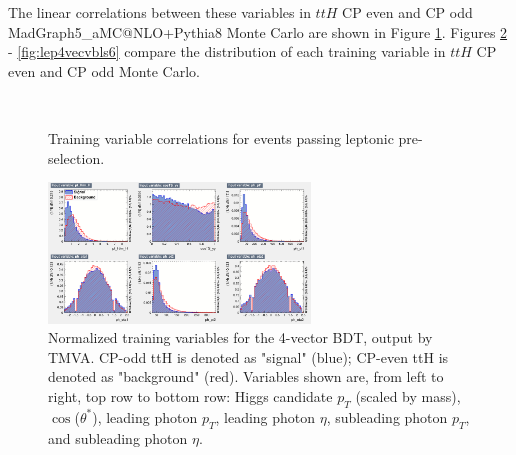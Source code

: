 The linear correlations between these variables in $ttH$ CP even and CP odd MadGraph5\_aMC@NLO+Pythia8 Monte Carlo are shown in Figure \ref{fig:lepcorr4vec}.  Figures \ref{fig:lep4vecvbls1} - \ref{fig:lep4vecvbls6} compare the distribution of each training variable in $ttH$ CP even and CP odd Monte Carlo.

\begin{figure}[htbp]
  \centering
    \\
 \caption{Training variable correlations for events passing leptonic pre-selection.}
  \label{fig:lepcorr4vec}
\end{figure}

\begin{figure}[htbp]
  \centering
  \includegraphics[width=0.62\textwidth]{figures/TMVABDTStudies/lep-vbls4vec/lep4vecvbls1.png}
  \caption{Normalized training variables for the 4-vector BDT, output by TMVA. CP-odd ttH is denoted as "signal" (blue); CP-even ttH is denoted as "background" (red). Variables shown are, from left to right, top row to bottom row: Higgs candidate $p_{T}$ (scaled by mass), $\cos$($\theta^{*}$), leading photon $p_{T}$, leading photon $\eta$, subleading photon $p_{T}$, and subleading photon $\eta$.}
  \label{fig:lep4vecvbls1}
\end{figure}

